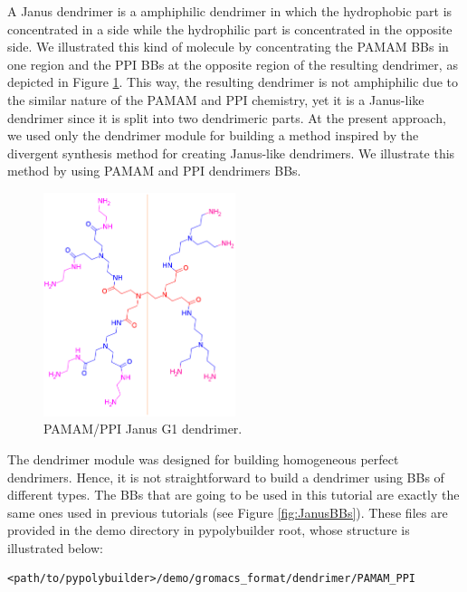
A Janus dendrimer is a amphiphilic dendrimer in which the hydrophobic part is concentrated in a side while the hydrophilic part is concentrated in the opposite side.
We illustrated this kind of molecule by concentrating the PAMAM BBs in one region and the PPI BBs at the opposite region of the resulting dendrimer, as depicted in Figure \ref{fig:JanusG1}.
This way, the resulting dendrimer is not amphiphilic due to the similar nature of the PAMAM and PPI chemistry, yet it is a Janus-like dendrimer since it is split into two dendrimeric parts.
At the present approach, we used only the dendrimer module for building a method inspired by the divergent synthesis method for creating Janus-like dendrimers.
We illustrate this method by using PAMAM and PPI dendrimers BBs.

\begin{figure}
    \centering
    \includegraphics[width=0.5\textwidth]{PAMAM_PPI-Janus/JANUSG1.png}
    \caption{PAMAM/PPI Janus G1 dendrimer.}
    \label{fig:JanusG1}
\end{figure}

The dendrimer module was designed for building homogeneous perfect dendrimers.
Hence, it is not straightforward to build a dendrimer using BBs of different types.
The BBs that are going to be used in this tutorial are exactly the same ones used in previous tutorials (see Figure \ref{fig:JanusBBs}).
These files are provided in the demo directory in pypolybuilder root, whose structure is illustrated below:
\begin{lstlisting}
<path/to/pypolybuilder>/demo/gromacs_format/dendrimer/PAMAM_PPI
\end{lstlisting}

